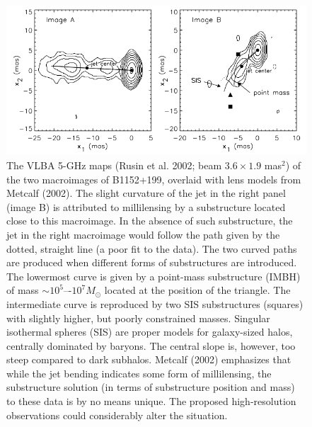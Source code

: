 \documentclass[a4paper, 11pt]{article}
\begin{document}
\begin{figure}[tbh]
\centering
\includegraphics[scale=0.75]{Figure_2002.jpg}
\caption{The VLBA 5-GHz maps (Rusin et al. 2002; beam $3.6 \times 1.9$ mas$^2$) of the two macroimages of B1152+199, overlaid with lens models from Metcalf (2002). The slight curvature of the jet in the right panel (image B) is attributed to millilensing by a substructure located close to this macroimage. In the absence of such substructure, the jet in the right macroimage would follow the path given by the dotted, straight line (a poor fit to the data). The two curved paths are produced when different forms of substructures are introduced. The lowermost curve is given by a point-mass substructure (IMBH) of mass $\sim 10^5$–-$10^7 M_\odot$ located at the position of the triangle. The intermediate curve is reproduced by two SIS substructures (squares) with slightly higher, but poorly constrained masses. Singular isothermal spheres (SIS) are proper models for galaxy-sized halos, centrally dominated by baryons. The central slope is, however, too steep compared to dark subhalos. Metcalf (2002) emphasizes that while the jet bending indicates some form of millilensing, the substructure solution (in terms of substructure position and mass) to these data is by no means unique. The proposed high-resolution observations could considerably alter the situation.} 
\end{figure}
\end{document}

